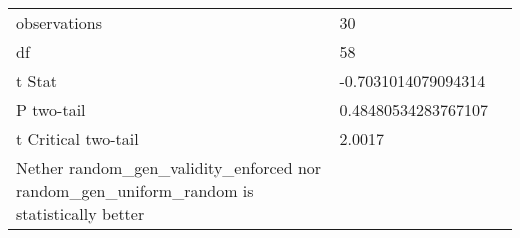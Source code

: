 \documentclass[11pt]{article}
\begin{document}
\begin{table}[H]
{\begin{tabular}{|l|l|l|}
                                                                                                    &                              &                                 \\ \hline
    observations                                                                                    & 30                           &                                 \\ \hline
    df                                                                                              & 58                           &                                 \\ \hline
    t Stat                                                                                          & -0.7031014079094314          &                                 \\ \hline
    P two-tail                                                                                      & 0.48480534283767107          &                                 \\ \hline
    t Critical two-tail                                                                             & 2.0017                       &                                 \\ \hline
    Nether random\_gen\_validity\_enforced nor random\_gen\_uniform\_random is statistically better &                              &                                 \\ \hline
    \end{tabular}%
    }
\end{table}
\end{document}
